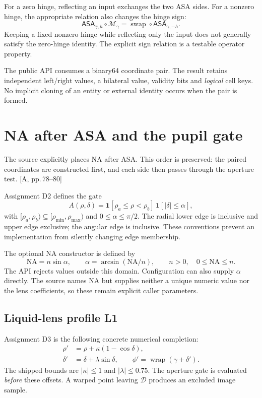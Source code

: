 \documentclass[11pt,a4paper]{article}
\newcommand{\src}[1]{\textcolor{muted}{[A, #1]}}
\newcommand{\ASA}{\mathsf{ASA}}
\newcommand{\wrap}{\operatorname{wrap}}
\begin{document}
For a zero hinge, reflecting an input exchanges the two ASA sides. For a nonzero hinge, the appropriate relation also changes the hinge sign:
\begin{equation}
\ASA_{\gamma,h}\circ\mathcal M_\gamma
=\operatorname{swap}\circ\ASA_{\gamma,-h}.
\end{equation}
Keeping a fixed nonzero hinge while reflecting only the input does not generally satisfy the zero-hinge identity. The explicit sign relation is a testable operator property.

The public API consumes a binary64 coordinate pair. The result retains independent left/right values, a bilateral value, validity bits and \emph{logical} cell keys. No implicit cloning of an entity or external identity occurs when the pair is formed.
\clearpage

\section{NA after ASA and the pupil gate}
The source explicitly places NA after ASA. This order is preserved: the paired coordinates are constructed first, and each side then passes through the aperture test. \src{pp.\,78--80}

Assignment D2 defines the gate
\begin{equation}
A(\rho,\delta)=\mathbf1[\rho_a\le\rho<\rho_b]\,\mathbf1[|\delta|\le\alpha],
\end{equation}
with $[\rho_a,\rho_b)\subseteq[\rho_{\min},\rho_{\max})$ and $0\le\alpha\le\pi/2$. The radial lower edge is inclusive and upper edge exclusive; the angular edge is inclusive. These conventions prevent an implementation from silently changing edge membership.

The optional NA constructor is defined by
\begin{equation}
\mathrm{NA}=n\sin\alpha,\qquad \alpha=\arcsin(\mathrm{NA}/n),\qquad n>0,\quad0\le\mathrm{NA}\le n.
\end{equation}
The API rejects values outside this domain. Configuration can also supply $\alpha$ directly. The source names NA but supplies neither a unique numeric value nor the lens coefficients, so these remain explicit caller parameters.

\subsection{Liquid-lens profile L1}
Assignment D3 is the following concrete numerical completion:
\begin{align}
\rho'&=\rho+\kappa(1-\cos\delta),\label{eq:lensr}\\
\delta'&=\delta+\lambda\sin\delta,\qquad\phi'=\wrap(\gamma+\delta').\label{eq:lensp}
\end{align}
The shipped bounds are $|\kappa|\le1$ and $|\lambda|\le0.75$. The aperture gate is evaluated \emph{before} these offsets. A warped point leaving $\mathcal D$ produces an excluded image sample.
\end{document}
